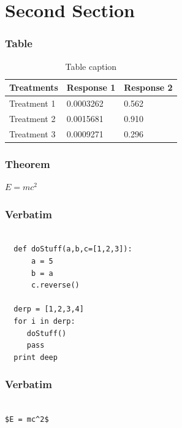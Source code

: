 \documentclass{beamer}
\begin{document}
\section{Second Section}

\begin{frame}
\frametitle{Table}
\begin{table}
\begin{tabular}{l l l}
\toprule
\textbf{Treatments} & \textbf{Response 1} & \textbf{Response 2}\\
\midrule
Treatment 1 & 0.0003262 & 0.562 \\
Treatment 2 & 0.0015681 & 0.910 \\
Treatment 3 & 0.0009271 & 0.296 \\
\bottomrule
\end{tabular}
\caption{Table caption}
\end{table}
\end{frame}


\begin{frame}
\frametitle{Theorem}
\begin{theorem}
$E = mc^2$
\end{theorem}
\end{frame}



\begin{frame}[fragile] %
\frametitle{Verbatim}
\begin{example}
\begin{verbatim}

  def doStuff(a,b,c=[1,2,3]):
      a = 5
      b = a 
      c.reverse()
  
  derp = [1,2,3,4]
  for i in derp:
     doStuff()
     pass
  print deep

\end{verbatim}
\end{example}
\end{frame}


\begin{frame}[fragile] %
\frametitle{Verbatim}
\begin{example}
\begin{verbatim}

$E = mc^2$

\end{verbatim}
\end{example}
\end{frame}
\end{document}
